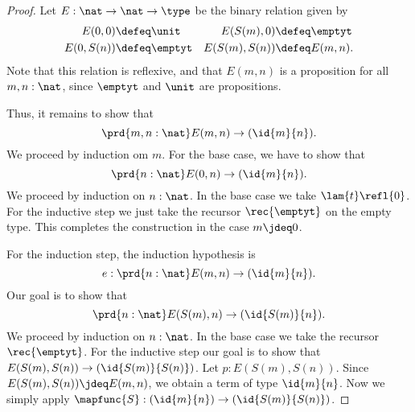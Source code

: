 \begin{proof}
Let $E:\nat\to\nat\to\type$ be the binary relation given by
\begin{align*}
E(0,0) & \defeq \unit & E(S(m),0) & \defeq \emptyt \\
E(0,S(n)) & \defeq \emptyt & E(S(m),S(n)) & \defeq E(m,n).
\end{align*}
Note that this relation is reflexive, and that $E(m,n)$ is a proposition for all $m,n:\nat$, since $\emptyt$ and $\unit$ are propositions.

Thus, it remains to show that
\begin{equation*}
\prd{m,n:\nat}E(m,n)\to (\id{m}{n}).
\end{equation*}
We proceed by induction om $m$. For the base case, we have to show that
\begin{equation*}
\prd{n:\nat}E(0,n)\to (\id{m}{n}).
\end{equation*}
We proceed by induction on $n:\nat$. In the base case we take $\lam{t}\refl{0}$. For the inductive step we just take the recursor $\rec{\emptyt}$ on the empty type. This completes the construction in the case $m\jdeq 0$.

For the induction step, the induction hypothesis is
\begin{equation*}
e:\prd{n:\nat}E(m,n)\to (\id{m}{n}).
\end{equation*}
Our goal is to show that
\begin{equation*}
\prd{n:\nat}E(S(m),n)\to (\id{S(m)}{n}).
\end{equation*}
We proceed by induction on $n:\nat$. In the base case we take the recursor $\rec{\emptyt}$. 
For the inductive step our goal is to show that $E(S(m),S(n))\to (\id{S(m)}{S(n)})$. Let $p:E(S(m),S(n))$. Since $E(S(m),S(n))\jdeq E(m,n)$, we obtain a term of type $\id{m}{n}$. Now we simply apply $\mapfunc{S}:(\id{m}{n})\to(\id{S(m)}{S(n)})$.
\end{proof}

